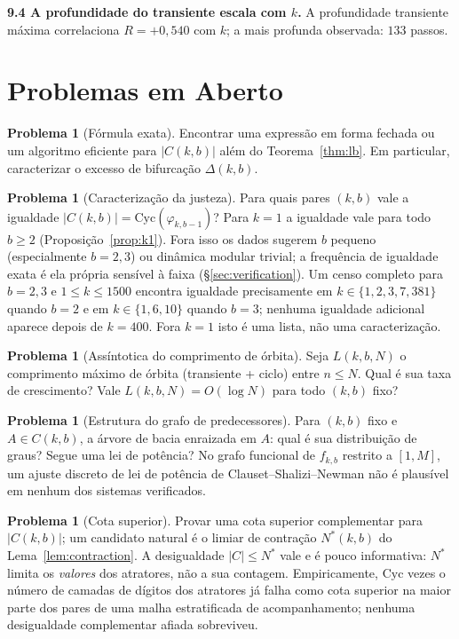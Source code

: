 \documentclass[11pt]{article}
\theoremstyle{definition}
\newtheorem{problem}[theorem]{Problema}
\theoremstyle{remark}
\newcommand{\Cyc}{\mathrm{Cyc}}
\begin{document}
\medskip
\noindent\textbf{9.4 A profundidade do transiente escala com $k$.} A profundidade transiente máxima correlaciona $R = +0{,}540$ com $k$; a mais profunda observada: $133$ passos.

\section{Problemas em Aberto}\label{sec:open}

\begin{problem}[Fórmula exata]
Encontrar uma expressão em forma fechada ou um algoritmo eficiente para $|C(k,b)|$ além do Teorema~\ref{thm:lb}. Em particular, caracterizar o excesso de bifurcação $\Delta(k,b)$.
\end{problem}

\begin{problem}[Caracterização da justeza]\label{prob:tight}
Para quais pares $(k,b)$ vale a igualdade $|C(k,b)| = \Cyc(\varphi_{k,b-1})$? Para $k=1$ a igualdade vale para todo $b\ge 2$ (Proposição~\ref{prop:k1}). Fora isso os dados sugerem $b$ pequeno (especialmente $b = 2,3$) ou dinâmica modular trivial; a frequência de igualdade exata é ela própria sensível à faixa (\S\ref{sec:verification}). Um censo completo para $b=2,3$ e $1 \le k \le 1500$ encontra igualdade precisamente em $k \in \{1,2,3,7,381\}$ quando $b=2$ e em $k \in \{1,6,10\}$ quando $b=3$; nenhuma igualdade adicional aparece depois de $k=400$. Fora $k=1$ isto é uma lista, não uma caracterização.
\end{problem}

\begin{problem}[Assíntotica do comprimento de órbita]
Seja $L(k,b,N)$ o comprimento máximo de órbita (transiente + ciclo) entre $n \le N$. Qual é sua taxa de crescimento? Vale $L(k,b,N) = O(\log N)$ para todo $(k,b)$ fixo?
\end{problem}

\begin{problem}[Estrutura do grafo de predecessores]
Para $(k,b)$ fixo e $A \in C(k,b)$, a árvore de bacia enraizada em $A$: qual é sua distribuição de graus? Segue uma lei de potência? No grafo funcional de $f_{k,b}$ restrito a $[1,M]$, um ajuste discreto de lei de potência de Clauset--Shalizi--Newman não é plausível em nenhum dos sistemas verificados.
\end{problem}

\begin{problem}[Cota superior]
Provar uma cota superior complementar para $|C(k,b)|$; um candidato natural é o limiar de contração $N^*(k,b)$ do Lema~\ref{lem:contraction}. A desigualdade $|C| \le N^*$ vale e é pouco informativa: $N^*$ limita os \emph{valores} dos atratores, não a sua contagem. Empiricamente, $\Cyc$ vezes o número de camadas de dígitos dos atratores já falha como cota superior na maior parte dos pares de uma malha estratificada de acompanhamento; nenhuma desigualdade complementar afiada sobreviveu.
\end{problem}
\end{document}
